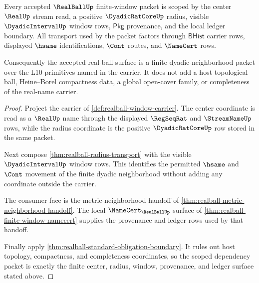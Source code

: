 \begin{theorem}
\label{thm:realball-scoped-dependency-packet}
Every accepted $\RealBallUp$ finite-window packet is scoped by the center $\RealUp$ stream read, a positive $\DyadicRatCoreUp$ radius, visible $\DyadicIntervalUp$ window rows, $\mathsf{Pkg}$ provenance, and the local ledger boundary. All transport used by the packet factors through $\mathsf{BHist}$ carrier rows, displayed $\hsame$ identifications, $\Cont$ routes, and $\NameCert$ rows.

Consequently the accepted real-ball surface is a finite dyadic-neighborhood packet over the L10 primitives named in the carrier. It does not add a host topological ball, Heine--Borel compactness data, a global open-cover family, or completeness of the real-name carrier.
\end{theorem}
\begin{proof}
Project the carrier of \autoref{def:realball-window-carrier}. The center coordinate is read as a $\RealUp$ name through the displayed $\RegSeqRat$ and $\StreamNameUp$ rows, while the radius coordinate is the positive $\DyadicRatCoreUp$ row stored in the same packet.

Next compose \autoref{thm:realball-radius-transport} with the visible $\DyadicIntervalUp$ window rows. This identifies the permitted $\hsame$ and $\Cont$ movement of the finite dyadic neighborhood without adding any coordinate outside the carrier.

The consumer face is the metric-neighborhood handoff of \autoref{thm:realball-metric-neighborhood-handoff}. The local $\NameCert_{\RealBallUp}$ surface of \autoref{thm:realball-finite-window-namecert} supplies the provenance and ledger rows used by that handoff.

Finally apply \autoref{thm:realball-standard-obligation-boundary}. It rules out host topology, compactness, and completeness coordinates, so the scoped dependency packet is exactly the finite center, radius, window, provenance, and ledger surface stated above.
\end{proof}

